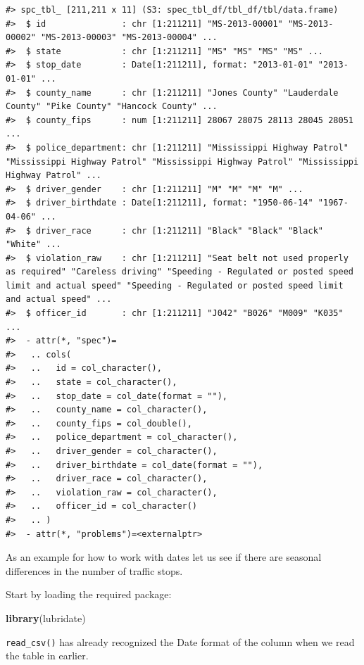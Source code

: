\documentclass[
]{book}
\newenvironment{Shaded}{\begin{snugshade}}{\end{snugshade}}
\newcommand{\CommentTok}[1]{\textcolor[rgb]{0.56,0.35,0.01}{\textit{#1}}}
\newcommand{\FunctionTok}[1]{\textcolor[rgb]{0.13,0.29,0.53}{\textbf{#1}}}
\newcommand{\NormalTok}[1]{#1}
\newcommand{\OtherTok}[1]{\textcolor[rgb]{0.56,0.35,0.01}{#1}}
\newcommand{\SpecialCharTok}[1]{\textcolor[rgb]{0.81,0.36,0.00}{\textbf{#1}}}
\begin{document}
\begin{verbatim}
#> spc_tbl_ [211,211 x 11] (S3: spec_tbl_df/tbl_df/tbl/data.frame)
#>  $ id               : chr [1:211211] "MS-2013-00001" "MS-2013-00002" "MS-2013-00003" "MS-2013-00004" ...
#>  $ state            : chr [1:211211] "MS" "MS" "MS" "MS" ...
#>  $ stop_date        : Date[1:211211], format: "2013-01-01" "2013-01-01" ...
#>  $ county_name      : chr [1:211211] "Jones County" "Lauderdale County" "Pike County" "Hancock County" ...
#>  $ county_fips      : num [1:211211] 28067 28075 28113 28045 28051 ...
#>  $ police_department: chr [1:211211] "Mississippi Highway Patrol" "Mississippi Highway Patrol" "Mississippi Highway Patrol" "Mississippi Highway Patrol" ...
#>  $ driver_gender    : chr [1:211211] "M" "M" "M" "M" ...
#>  $ driver_birthdate : Date[1:211211], format: "1950-06-14" "1967-04-06" ...
#>  $ driver_race      : chr [1:211211] "Black" "Black" "Black" "White" ...
#>  $ violation_raw    : chr [1:211211] "Seat belt not used properly as required" "Careless driving" "Speeding - Regulated or posted speed limit and actual speed" "Speeding - Regulated or posted speed limit and actual speed" ...
#>  $ officer_id       : chr [1:211211] "J042" "B026" "M009" "K035" ...
#>  - attr(*, "spec")=
#>   .. cols(
#>   ..   id = col_character(),
#>   ..   state = col_character(),
#>   ..   stop_date = col_date(format = ""),
#>   ..   county_name = col_character(),
#>   ..   county_fips = col_double(),
#>   ..   police_department = col_character(),
#>   ..   driver_gender = col_character(),
#>   ..   driver_birthdate = col_date(format = ""),
#>   ..   driver_race = col_character(),
#>   ..   violation_raw = col_character(),
#>   ..   officer_id = col_character()
#>   .. )
#>  - attr(*, "problems")=<externalptr>
\end{verbatim}

As an example for how to work with dates let us see if there are seasonal differences in the number of traffic stops.

Start by loading the required package:

\begin{Shaded}
\begin{Highlighting}[]
\FunctionTok{library}\NormalTok{(lubridate)}
\end{Highlighting}
\end{Shaded}

\texttt{read\_csv()} has already recognized the Date format of the column when we read the table in earlier.

\begin{Shaded}
\end{Shaded}
\end{document}

